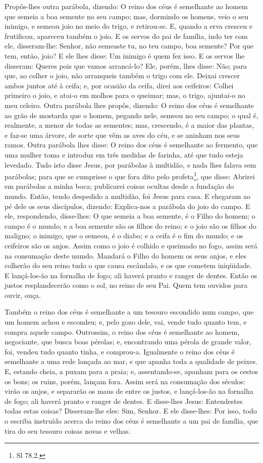Propôs-lhes outra parábola, dizendo: O reino dos céus é
semelhante ao homem que semeia a boa semente no seu campo;
mas, dormindo os homens, veio o seu inimigo, e semeou joio no
meio do trigo, e retirou-se. E, quando a erva cresceu e
frutificou, apareceu também o joio. E os servos do pai de
família, indo ter com ele, disseram-lhe: Senhor, não semeaste tu, no
teu campo, boa semente? Por que tem, então, joio? E ele lhes
disse: Um inimigo é quem fez isso. E os servos lhe disseram: Queres
pois que vamos arrancá-lo? Ele, porém, lhes disse: Não; para
que, ao colher o joio, não arranqueis também o trigo com ele.
Deixai crescer ambos juntos até à ceifa; e, por ocasião da
ceifa, direi aos ceifeiros: Colhei primeiro o joio, e atai-o em
molhos para o queimar; mas, o trigo, ajuntai-o no meu celeiro.
Outra parábola lhes propôs, dizendo: O reino dos céus é
semelhante ao grão de mostarda que o homem, pegando nele, semeou no
seu campo; o qual é, realmente, a menor de todas as sementes;
mas, crescendo, é a maior das plantas, e faz-se uma árvore, de sorte
que vêm as aves do céu, e se aninham nos seus ramos. Outra
parábola lhes disse: O reino dos céus é semelhante ao fermento, que
uma mulher toma e introduz em três medidas de farinha, até que tudo
esteja levedado. Tudo isto disse Jesus, por parábolas à
multidão, e nada lhes falava sem parábolas; para que se
cumprisse o que fora dito pelo profeta\footnote{Sl 78.2.}, que
disse: Abrirei em parábolas a minha boca; publicarei coisas ocultas
desde a fundação do mundo. Então, tendo despedido a multidão,
foi Jesus para casa. E chegaram ao pé dele os seus discípulos,
dizendo: Explica-nos a parábola do joio do campo. E ele,
respondendo, disse-lhes: O que semeia a boa semente, é o Filho do
homem; o campo é o mundo; e a boa semente são os filhos do
reino; e o joio são os filhos do maligno; o inimigo, que o
semeou, é o diabo; e a ceifa é o fim do mundo; e os ceifeiros são os
anjos. Assim como o joio é colhido e queimado no fogo, assim
será na consumação deste mundo. Mandará o Filho do homem os
seus anjos, e eles colherão do seu reino tudo o que causa escândalo,
e os que cometem iniqüidade. E lançá-los-ão na fornalha de
fogo; ali haverá pranto e ranger de dentes. Então os justos
resplandecerão como o sol, no reino de seu Pai. Quem tem ouvidos
para ouvir, ouça.

Também o reino dos céus é semelhante a um tesouro escondido num
campo, que um homem achou e escondeu; e, pelo gozo dele, vai, vende
tudo quanto tem, e compra aquele campo. Outrossim, o reino
dos céus é semelhante ao homem, negociante, que busca boas pérolas;
e, encontrando uma pérola de grande valor, foi, vendeu tudo
quanto tinha, e comprou-a. Igualmente o reino dos céus é
semelhante a uma rede lançada ao mar, e que apanha toda a qualidade
de peixes. E, estando cheia, a puxam para a praia; e,
assentando-se, apanham para os cestos os bons; os ruins, porém,
lançam fora. Assim será na consumação dos séculos: virão os
anjos, e separarão os maus de entre os justos, e lançá-los-ão
na fornalha de fogo; ali haverá pranto e ranger de dentes. E
disse-lhes Jesus: Entendestes todas estas coisas? Disseram-lhe eles:
Sim, Senhor. E ele disse-lhes: Por isso, todo o escriba
instruído acerca do reino dos céus é semelhante a um pai de família,
que tira do seu tesouro coisas novas e velhas.

